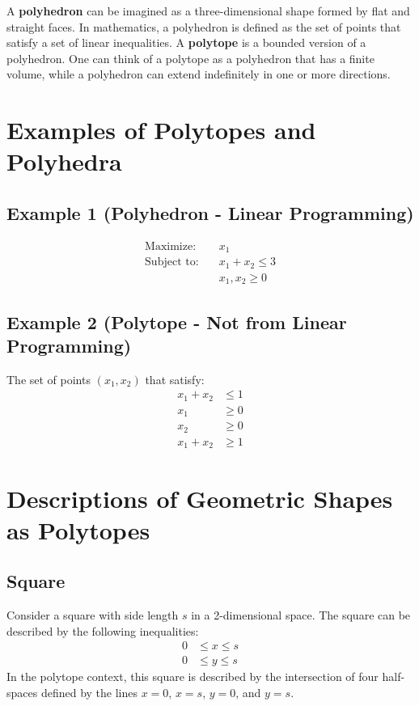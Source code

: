 \documentclass[]{article}
\theoremstyle{definition}
\theoremstyle{definition}
\begin{document}
A \textbf{polyhedron} can be imagined as a three-dimensional shape formed by flat and straight faces. In mathematics, a polyhedron is defined as the set of points that satisfy a set of linear inequalities. A \textbf{polytope} is a bounded version of a polyhedron. One can think of a polytope as a polyhedron that has a finite volume, while a polyhedron can extend indefinitely in one or more directions.

\section*{Examples of Polytopes and Polyhedra}

\subsection*{Example 1 (Polyhedron - Linear Programming)}
\begin{align}
\text{Maximize:} \quad & x_1 \\
\text{Subject to:} \quad & x_1 + x_2 \leq 3 \\
& x_1, x_2 \geq 0
\end{align}

\subsection*{Example 2 (Polytope - Not from Linear Programming)}
The set of points \((x_1, x_2)\) that satisfy:
\begin{align}
x_1 + x_2 & \leq 1 \\
x_1 &\geq 0 \\
x_2 &\geq 0 \\
x_1 + x_2 &\geq 1
\end{align}

\section*{Descriptions of Geometric Shapes as Polytopes}

\subsection*{Square}

Consider a square with side length \( s \) in a 2-dimensional space. The square can be described by the following inequalities:
\begin{align*}
0 &\leq x \leq s \\
0 &\leq y \leq s
\end{align*}
In the polytope context, this square is described by the intersection of four half-spaces defined by the lines \( x = 0 \), \( x = s \), \( y = 0 \), and \( y = s \).
\end{document}

